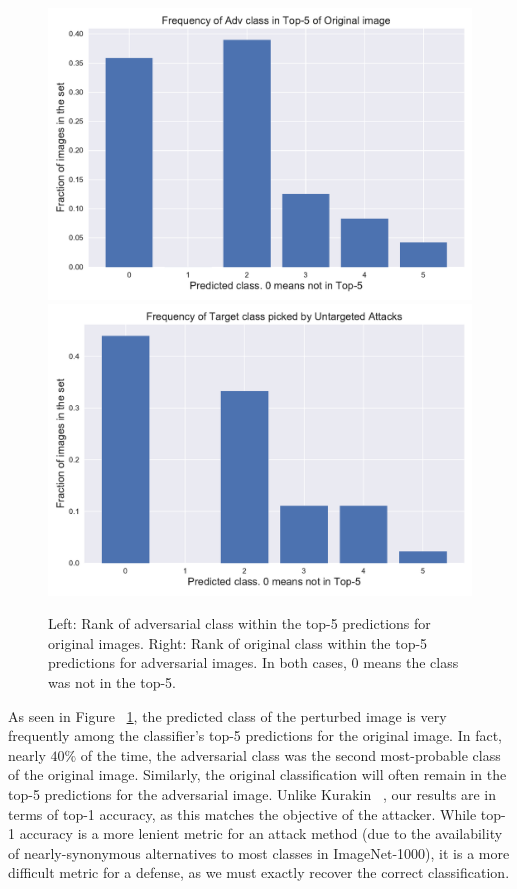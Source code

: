\begin{figure}[H]
\centering
   \includegraphics[width=0.49\linewidth]{figures/pixel/untargeted.pdf}
   \includegraphics[width=0.49\linewidth]{figures/pixel/retargeted.pdf}
   \caption{Left: Rank of adversarial class within the top-5 predictions for original images.  Right: Rank of original class within the top-5 predictions for adversarial images.  In both cases, 0 means the class was not in the top-5.}
   \label{fig:untarget}
\end{figure}
As seen in Figure ~\ref{fig:untarget}, the predicted class of the perturbed image is very frequently among the classifier's top-5 predictions for the original image.
In fact, nearly $40\%$ of the time, the adversarial class was the second most-probable class of the original image.
Similarly, the original classification will often remain in the top-5 predictions for the adversarial image.
Unlike Kurakin \etal ~\cite{Kurakin2016AdversarialEI}, our results are in terms of top-1 accuracy, as this matches the objective of the attacker.
While top-1 accuracy is a more lenient metric for an attack method (due to the availability of nearly-synonymous alternatives to most classes in ImageNet-1000), it is a more difficult metric for a defense, as we must exactly recover the correct classification.
